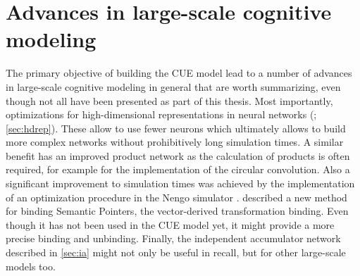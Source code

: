 \section{Advances in large-scale cognitive modeling}
The primary objective of building the CUE model lead to a number of advances in large-scale cognitive modeling in general that are worth summarizing, even though not all have been presented as part of this thesis.
Most importantly, optimizations for high-dimensional representations in neural networks (\cite{gosmann216}; \cref{sec:hdrep}).
These allow to use fewer neurons which ultimately allows to build more complex networks without prohibitively long simulation times.
A similar benefit has an improved product network \parencite{gosmann2015-1} as the calculation of products is often required, for example for the implementation of the circular convolution.
Also a significant improvement to simulation times was achieved by the implementation of an optimization procedure in the Nengo simulator \parencite{gosmann2017}.
 described a new method for binding Semantic Pointers, the vector-derived transformation binding.
Even though it has not been used in the CUE model yet, it might provide a more precise binding and unbinding.
Finally, the independent accumulator network described in \cref{sec:ia} might not only be useful in recall, but for other large-scale models too.


